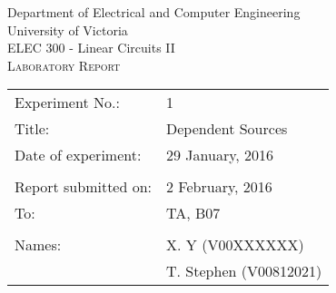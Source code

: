 \begin{center}
	\begin{LARGE}
		Department of Electrical and Computer Engineering \\
		University of Victoria \\
		ELEC 300 - Linear Circuits II \\[1cm]
		\textsc{Laboratory Report}
		\\[1cm]
	\end{LARGE}
\end{center}

\begin{tabular}{ p{} p{} }
	Experiment No.: & 1 \\ 
	Title: & Dependent Sources \\ 
	Date of experiment:& 29 January, 2016 \\ 
	& \\
	Report submitted on:& 2 February, 2016 \\ 
	To: & TA, B07 \\ 
	& \\
	Names: & X. Y (V00XXXXXX)\\
	& T. Stephen (V00812021)  
\end{tabular}

\newpage